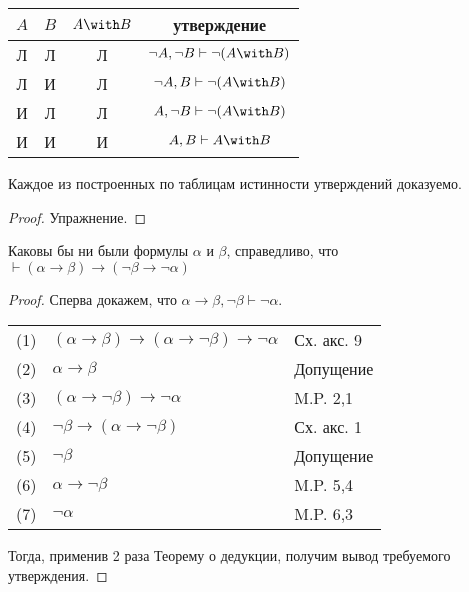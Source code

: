 \begin{tabular}{cccc}
$A$ & $B$ & $A \with B$ & утверждение\\
\hline
Л & Л & Л & $\neg A, \neg B \vdash \neg (A \with B)$\\
Л & И & Л & $\neg A, B \vdash \neg (A \with B)$\\
И & Л & Л & $A, \neg B \vdash \neg (A \with B)$\\
И & И & И & $A, B \vdash A \with B$
\end{tabular}

\label{valuation_formula}
\begin{lemma}
Каждое из построенных по таблицам истинности утверждений доказуемо.
\end{lemma}
\begin{proof} Упражнение.
\end{proof}

\begin{lemma}\label{contraposition}Каковы бы ни были формулы $\alpha$ и $\beta$, справедливо, что 
$\vdash (\alpha \rightarrow \beta) \rightarrow (\neg\beta \rightarrow \neg\alpha)$
\end{lemma}

\begin{proof}
Сперва докажем, что $\alpha \rightarrow \beta, \neg\beta \vdash \neg\alpha$.

\begin{tabular}{lll}
(1) & $(\alpha \rightarrow \beta) \rightarrow (\alpha \rightarrow \neg\beta) \rightarrow \neg\alpha$ & Сх. акс. 9\\
(2) & $\alpha \rightarrow \beta$ & Допущение\\
(3) & $(\alpha \rightarrow \neg\beta) \rightarrow \neg\alpha$ & M.P. 2,1\\
(4) & $\neg\beta \rightarrow (\alpha \rightarrow \neg\beta)$ & Сх. акс. 1\\
(5) & $\neg\beta$ & Допущение\\
(6) & $\alpha \rightarrow \neg\beta$ & M.P. 5,4\\
(7) & $\neg\alpha$ & M.P. 6,3
\end{tabular}


Тогда, применив 2 раза Теорему о дедукции, получим вывод требуемого утверждения.
\end{proof}

